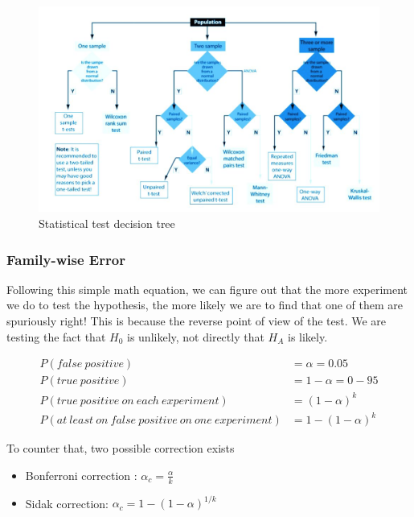 \begin{figure}[h]%
 \centering
 \includegraphics[width=15cm]{./pic/choose_test}
 \caption{\label{pic:testtree} Statistical test decision tree}
\end{figure}


\subsubsection{Family-wise Error}

Following this simple math equation, we can figure out that the more experiment we do to test the hypothesis, the more likely we are to find that one of them are spuriously right! This is because the reverse point of view of the test. We are testing the fact that $H_0$ is unlikely, not directly that $H_A$ is likely. 

\begin{equation} \label{eq1}
\begin{split}
P(false \: positive) &= \alpha = 0.05 \\ 
P(true \: positive) &= 1 - \alpha = 0-95 \\
P(true \: positive \: on \: each \: experiment) &= (1 - \alpha)^k \\
P(at \: least \: on \: false \: positive \: on \: one \: experiment) &= 1 - (1 - \alpha)^k
\end{split}
\end{equation}

To counter that, two possible correction exists
\begin{itemize}
  \item Bonferroni correction : $\alpha_c = \frac{\alpha}{k}$ 
  \item Sidak correction: $\alpha_c = 1- (1 - \alpha)^{1/k} $
\end{itemize}


